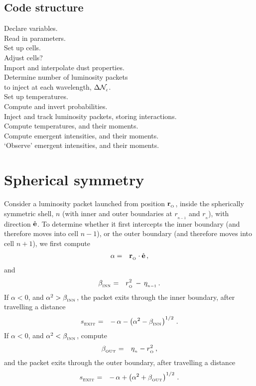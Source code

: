 \documentclass[usenatbib]{mn2e}
\newcommand{\subO}{_{_{\rm O}}}
\numberwithin{equation}{section}
\begin{document}
\subsection{Code structure}

Declare variables. \\
Read in parameters. \\
Set up cells. \\
Adjust cells? \\
Import and interpolate dust properties. \\
Determine number of luminosity packets \\
\hspace*{2.5cm} to inject at each wavelength, $\Delta{\cal N}_{_\ell}$. \\
Set up temperatures. \\
Compute and invert probabilities. \\
Inject and track luminosity packets, storing interactions. \\
Compute temperatures, and their moments. \\
Compute emergent intensities, and their moments. \\
`Observe' emergent intensities, and their moments. \\



\section{Spherical symmetry}

Consider a luminosity packet launched from position ${\bf r}\subO$, inside the spherically symmetric shell, $n$ (with inner and outer boundaries at $r_{_{n-1}}$ and $r_{_n}$), with direction $\hat{\bf e}$. To determine whether it first intercepts the inner boundary (and therefore moves into cell $n-1$), or the outer boundary (and therefore moves into cell $n+1$), we first compute
\begin{eqnarray}
\alpha&=&{\bf r}\subO\cdot\hat{\bf e}\,,
\end{eqnarray}
and
\begin{eqnarray}
\beta_{_{\rm INN}}&=&r\subO^2\,-\,\eta_{_{n-1}}\,.
\end{eqnarray}
If $\alpha<0$, and $\alpha^2>\beta_{_{\rm INN}}$, the packet exits through the inner boundary, after travelling a distance
\begin{eqnarray}
s_{_{\rm EXIT}}&=&-\,\alpha-\left(\alpha^2-\beta_{_{\rm INN}}\right)^{1/2}\,.
\end{eqnarray}
If $\alpha<0$, and $\alpha^2<\beta_{_{\rm INN}}$, compute 
\begin{eqnarray}
\beta_{_{\rm OUT}}&=&\eta_{_n}-r\subO^2\,,
\end{eqnarray}
and the packet exits through the outer boundary, after travelling a distance
\begin{eqnarray}
s_{_{\rm EXIT}}&=&-\,\alpha+\left(\alpha^2+\beta_{_{\rm OUT}}\right)^{1/2}\,.
\end{eqnarray}
\end{document}
